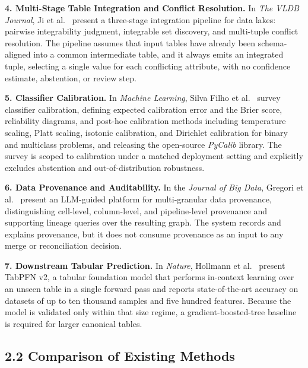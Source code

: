 \documentclass[12pt,a4paper]{article}
\begin{document}
\textbf{4. Multi-Stage Table Integration and Conflict Resolution.}
In \textit{The VLDB Journal}, Ji et al.\ \cite{ji2025tableintegration} present a three-stage integration pipeline for data lakes: pairwise integrability judgment, integrable set discovery, and multi-tuple conflict resolution. The pipeline assumes that input tables have already been schema-aligned into a common intermediate table, and it always emits an integrated tuple, selecting a single value for each conflicting attribute, with no confidence estimate, abstention, or review step.

\textbf{5. Classifier Calibration.}
In \textit{Machine Learning}, Silva Filho et al.\ \cite{silvafilho2023calibration} survey classifier calibration, defining expected calibration error and the Brier score, reliability diagrams, and post-hoc calibration methods including temperature scaling, Platt scaling, isotonic calibration, and Dirichlet calibration for binary and multiclass problems, and releasing the open-source \textit{PyCalib} library. The survey is scoped to calibration under a matched deployment setting and explicitly excludes abstention and out-of-distribution robustness.

\textbf{6. Data Provenance and Auditability.}
In the \textit{Journal of Big Data}, Gregori et al.\ \cite{gregori2025prolit} present an LLM-guided platform for multi-granular data provenance, distinguishing cell-level, column-level, and pipeline-level provenance and supporting lineage queries over the resulting graph. The system records and explains provenance, but it does not consume provenance as an input to any merge or reconciliation decision.

\textbf{7. Downstream Tabular Prediction.}
In \textit{Nature}, Hollmann et al.\ \cite{hollmann2025tabpfn} present TabPFN v2, a tabular foundation model that performs in-context learning over an unseen table in a single forward pass and reports state-of-the-art accuracy on datasets of up to ten thousand samples and five hundred features. Because the model is validated only within that size regime, a gradient-boosted-tree baseline is required for larger canonical tables.

\subsection*{2.2 Comparison of Existing Methods}

\needspace{0.78\textheight}
\end{document}
